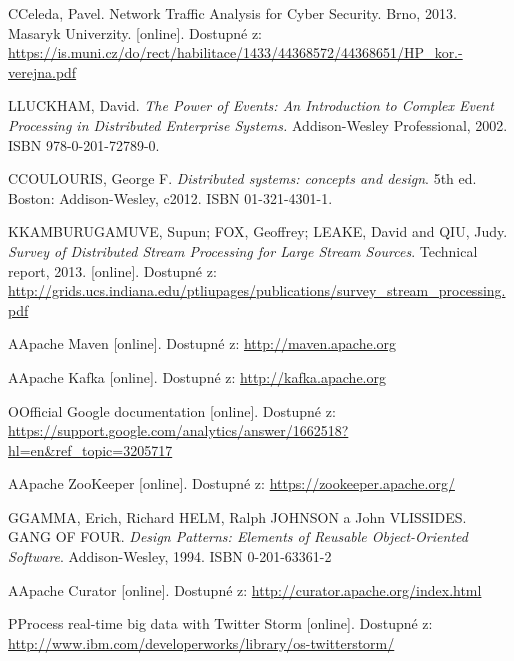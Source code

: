 \documentclass[
  digital, %
  table,   %
  nolof,     %
  nolot,     %
  oneside, %
  nocover,
  monochrome,
  12pt
]{fithesis3}
\begin{document}
\begin{thebibliography}{99}
\bibitem
CCeleda, Pavel. Network Traffic Analysis for Cyber Security. Brno, 2013. Masaryk Univerzity. [online]. Dostupné z: \url{https://is.muni.cz/do/rect/habilitace/1433/44368572/44368651/HP_kor.-verejna.pdf} \label{bib_celeda}

\bibitem
LLUCKHAM, David. \textit{The Power of Events: An Introduction to Complex
Event Processing in Distributed Enterprise Systems.} Addison-Wesley Professional, 2002. ISBN 978-0-201-72789-0. \label{bib_1}

\bibitem
CCOULOURIS, George F. \textit{Distributed systems: concepts and design}. 5th ed. Boston: Addison-Wesley, c2012. ISBN 01-321-4301-1. \label{bib_2}

\bibitem
KKAMBURUGAMUVE, Supun; FOX, Geoffrey; LEAKE, David and QIU, Judy. \textit{Survey of Distributed Stream Processing for Large Stream Sources}. Technical report, 2013. [online]. Dostupné z: \url{http://grids.ucs.indiana.edu/ptliupages/publications/survey_stream_processing.pdf} \label{bib_3}

\bibitem
AApache Maven [online]. Dostupné z: \url{http://maven.apache.org} \label{bib_4}

\bibitem
AApache Kafka [online]. Dostupné z: \url{http://kafka.apache.org} \label{bib_5}

\bibitem
OOfficial Google documentation  [online]. Dostupné z: \url{https://support.google.com/analytics/answer/1662518?hl=en&ref_topic=3205717} \label{bib_6}

\bibitem
AApache ZooKeeper [online]. Dostupné z: \url{https://zookeeper.apache.org/} \label{bib_7}

\bibitem
GGAMMA, Erich, Richard HELM, Ralph JOHNSON a John VLISSIDES. GANG OF FOUR. \textit{Design Patterns: Elements of Reusable Object-Oriented Software}. Addison-Wesley, 1994. ISBN 0-201-63361-2 \label{bib_8}

\bibitem
AApache Curator [online]. Dostupné z: \url{http://curator.apache.org/index.html} \label{bib_9}

\bibitem
PProcess real-time big data with Twitter Storm [online]. Dostupné z: \url{http://www.ibm.com/developerworks/library/os-twitterstorm/} \label{bib_distributed_computing}



\end{thebibliography}
\appendix %
\end{document}
